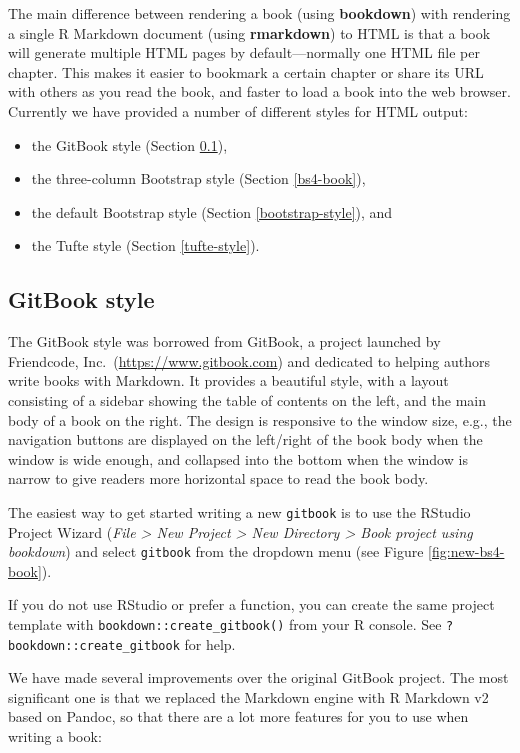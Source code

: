 \documentclass[
  12pt,
]{krantz}
\providecommand{\tightlist}{%
  \setlength{\itemsep}{0pt}\setlength{\parskip}{0pt}}
\theoremstyle{definition}
\theoremstyle{definition}
\theoremstyle{definition}
\theoremstyle{definition}
\theoremstyle{remark}
\begin{document}
The main difference between rendering a book (using \textbf{bookdown}) with rendering a single R Markdown document (using \textbf{rmarkdown}) to HTML is that a book will generate multiple HTML pages by default---normally one HTML file per chapter. This makes it easier to bookmark a certain chapter or share its URL with others as you read the book, and faster to load a book into the web browser. Currently we have provided a number of different styles for HTML output:

\begin{itemize}
\tightlist
\item
  the GitBook style (Section \ref{gitbook-style}),
\item
  the three-column Bootstrap style (Section \ref{bs4-book}),
\item
  the default Bootstrap style (Section \ref{bootstrap-style}), and
\item
  the Tufte style (Section \ref{tufte-style}).
\end{itemize}

\subsection{GitBook style}\label{gitbook-style}

The GitBook style was borrowed from GitBook, a project launched by Friendcode, Inc.~(\url{https://www.gitbook.com}) and dedicated to helping authors write books with Markdown. It provides a beautiful style, with a layout consisting of a sidebar showing the table of contents on the left, and the main body of a book on the right. The design is responsive to the window size, e.g., the navigation buttons are displayed on the left/right of the book body when the window is wide enough, and collapsed into the bottom when the window is narrow to give readers more horizontal space to read the book body.

The easiest way to get started writing a new \texttt{gitbook} is to use the RStudio Project Wizard (\emph{File \textgreater{} New Project \textgreater{} New Directory \textgreater{} Book project using bookdown}) and select \texttt{gitbook} from the dropdown menu (see Figure \ref{fig:new-bs4-book}).

If you do not use RStudio or prefer a function, you can create the same project template with \texttt{bookdown::create\_gitbook()} from your R console. See \texttt{?bookdown::create\_gitbook} for help.

We have made several improvements over the original GitBook project. The most significant one is that we replaced the Markdown engine with R Markdown v2 based on Pandoc, so that there are a lot more features for you to use when writing a book:
\end{document}
